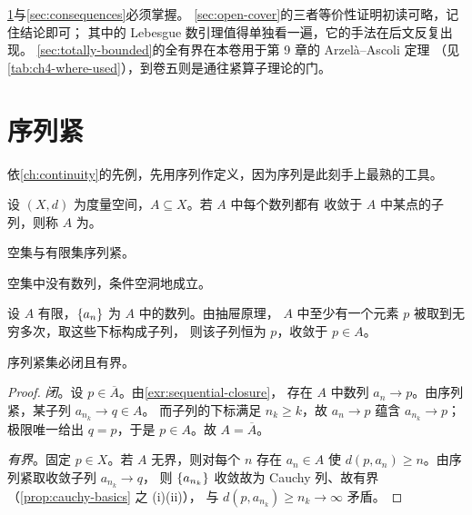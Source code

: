 \begin{remark}[读法建议]
  \cref{sec:seq-compact}与\cref{sec:consequences}必须掌握。
  \cref{sec:open-cover}的三者等价性证明初读可略，记住结论即可；
  其中的 Lebesgue 数引理值得单独看一遍，它的手法在后文反复出现。
  \cref{sec:totally-bounded}的全有界在本卷用于第 9 章的 Arzelà--Ascoli 定理
  （见\cref{tab:ch4-where-used}），到卷五则是通往紧算子理论的门。
\end{remark}

\section{序列紧}
\label{sec:seq-compact}

依\cref{ch:continuity}的先例，先用序列作定义，因为序列是此刻手上最熟的工具。

\begin{definition}[序列紧]
  \label{def:seq-compact}
  设 \((X,d)\) 为度量空间，\(A \subseteq X\)。若 \(A\) 中每个数列都有
  收敛于 \(A\) 中某点的子列，则称 \(A\) 为。
\end{definition}

\begin{example}[平凡的情形]
  \label{ex:trivial-compact}
  空集与有限集序列紧。
  \begin{worked}
    空集中没有数列，条件空洞地成立。

    设 \(A\) 有限，\(\{a_{n}\}\) 为 \(A\) 中的数列。由抽屉原理，
    \(A\) 中至少有一个元素 \(p\) 被取到无穷多次，取这些下标构成子列，
    则该子列恒为 \(p\)，收敛于 \(p \in A\)。
  \end{worked}
\end{example}

\begin{theorem}
  \label{thm:compact-closed-bounded}
  序列紧集必闭且有界。
\end{theorem}

\begin{proof}
  \emph{闭}。设 \(p \in \overline{A}\)。由\cref{exr:sequential-closure}，
  存在 \(A\) 中数列 \(a_{n} \to p\)。由序列紧，某子列 \(a_{n_{k}} \to q \in A\)。
  而子列的下标满足 \(n_{k} \ge k\)，故 \(a_{n} \to p\) 蕴含 \(a_{n_{k}} \to p\)；
  极限唯一给出 \(q = p\)，于是 \(p \in A\)。故 \(A = \overline{A}\)。

  \emph{有界}。固定 \(p \in X\)。若 \(A\) 无界，则对每个 \(n\) 存在
  \(a_{n} \in A\) 使 \(d(p,a_{n}) \ge n\)。由序列紧取收敛子列 \(a_{n_{k}} \to q\)，
  则 \(\{a_{n_{k}}\}\) 收敛故为 Cauchy 列、故有界
  （\cref{prop:cauchy-basics} 之 (i)(ii)），
  与 \(d(p,a_{n_{k}}) \ge n_{k} \to \infty\) 矛盾。
\end{proof}


